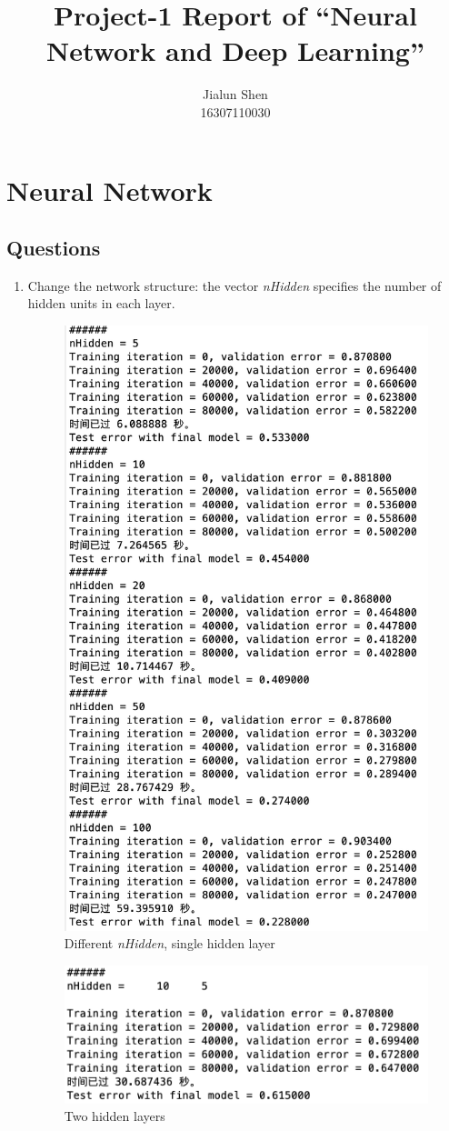 \documentclass[10pt]{article}
\title{Project-1 Report of ``Neural Network and Deep Learning''}
\author{Jialun Shen\\ 16307110030}
\begin{document}
\maketitle
\section{Neural Network}
\subsection{Questions}
\begin{enumerate}

\item Change the network structure: the vector \textit{nHidden} specifies the number of hidden units in each layer.

\begin{figure}[htbp]
  \centering
  \includegraphics[width=0.5\linewidth]{figures/q1-1.png}
  \caption{Different \textit{nHidden}, single hidden layer}
  \label{fig:q1-1}
\end{figure}

\begin{figure}[htbp]
  \centering
  \includegraphics[width=0.5\linewidth]{figures/q1-2.png}
  \caption{Two hidden layers}
  \label{fig:q1-2}
\end{figure}


\end{enumerate}
\end{document}
